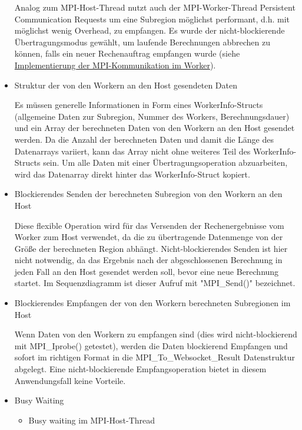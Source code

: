 \begin{itemize}
	Analog zum MPI-Host-Thread nutzt auch der MPI-Worker-Thread Persistent Communication Requests um eine Subregion möglichst performant, d.h. mit möglichst wenig Overhead, zu empfangen. Es wurde der nicht-blockierende Übertragungsmodus gewählt, um laufende Berechnungen abbrechen zu können, falls ein neuer Rechenauftrag empfangen wurde (siehe \hyperref[para:impl_mpi_worker]{Implementierung der MPI-Kommunikation im Worker}).
	
	\item Struktur der von den Workern an den Host gesendeten Daten
	
	Es müssen generelle Informationen in Form eines WorkerInfo-Structs (allgemeine Daten zur Subregion, Nummer des Workers, Berechnungsdauer) und ein Array der berechneten Daten von den Workern an den Host gesendet werden. Da die Anzahl der berechneten Daten und damit die Länge des Datenarrays variiert, kann das Array nicht ohne weiteres Teil des WorkerInfo-Structs sein. Um alle Daten mit einer Übertragungsoperation abzuarbeiten, wird das Datenarray direkt hinter das WorkerInfo-Struct kopiert.
	
	\item Blockierendes Senden der berechneten Subregion von den Workern an den Host
	
	Diese flexible Operation wird für das Versenden der Rechenergebnisse vom Worker zum Host verwendet, da die zu übertragende Datenmenge von der Größe der berechneten Region abhängt. Nicht-blockierendes Senden ist hier nicht notwendig, da das Ergebnis nach der abgeschlossenen Berechnung in jeden Fall an den Host gesendet werden soll, bevor eine neue Berechnung startet. Im Sequenzdiagramm ist dieser Aufruf mit "MPI\_Send()" bezeichnet.
	
	\item Blockierendes Empfangen der von den Workern berechneten Subregionen im Host
	
	Wenn Daten von den Workern zu empfangen sind (dies wird nicht-blockierend mit MPI\_Iprobe() getestet), werden die Daten blockierend Empfangen und sofort im richtigen Format in die MPI\_To\_Websocket\_Result Datenstruktur abgelegt. Eine nicht-blockierende Empfangsoperation bietet in diesem Anwendungsfall keine Vorteile.
	
	\item Busy Waiting
	
	\begin{itemize}
		\item Busy waiting im MPI-Host-Thread
		

\end{itemize}
\end{itemize}

